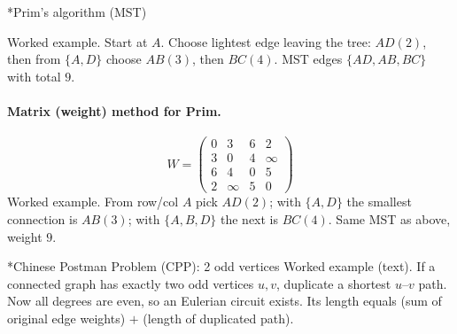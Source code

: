 \documentclass[11pt]{article}
\def\textbf#1{#1}%
\begin{document}
\textbf*{Prim's algorithm (MST)}
\begin{center}

\par\small\textbf{Worked example.}
Start at $A$. Choose lightest edge leaving the tree:
$AD(2)$, then from $\{A,D\}$ choose $AB(3)$, then $BC(4)$.
MST edges $\{AD,AB,BC\}$ with total $9$.
\end{center}

\paragraph{Matrix (weight) method for Prim.}
\[
W=\begin{pmatrix}
0 & 3 & 6 & 2\\
3 & 0 & 4 & \infty\\
6 & 4 & 0 & 5\\
2 & \infty & 5 & 0
\end{pmatrix}
\]
\small\textbf{Worked example.}
From row/col $A$ pick $AD(2)$; with $\{A,D\}$ the smallest connection is $AB(3)$; with $\{A,B,D\}$ the next is $BC(4)$.
Same MST as above, weight $9$.

\textbf*{Chinese Postman Problem (CPP): 2 odd vertices}
\small\textbf{Worked example (text).}
If a connected graph has exactly two odd vertices $u,v$, duplicate a shortest $u$--$v$ path.
Now all degrees are even, so an Eulerian circuit exists.
Its length equals (sum of original edge weights) $+$ (length of duplicated path).
\end{document}

